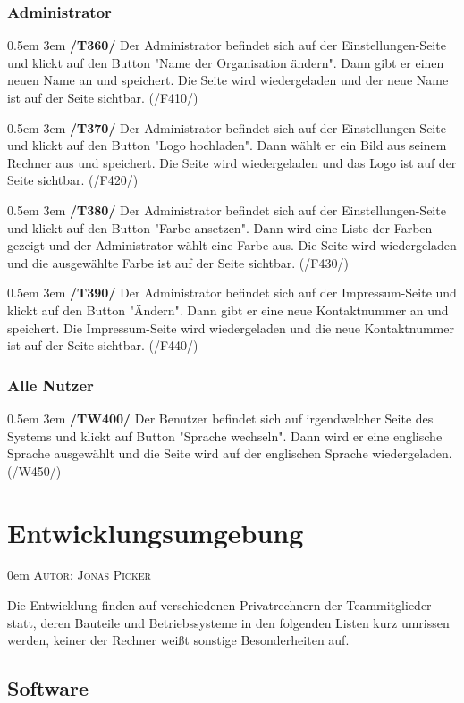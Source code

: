 \documentclass{article}
\makeatletter
\newcommand{\sectionauthor}[1]{
	{\parindent 0em \large \scshape Autor: #1 \par \nobreak \vspace*{2em}}
	\@afterheading
}
\newcommand{\specification}[3]{
	{\parindent 0.5em \hangindent 3em \hypertarget{spec:#1:#2}{\textbf{/#1#2/}} #3 \par \nobreak \vspace*{0.5em}}
}
\makeatother
\begin{document}
		\subsubsection{Administrator}
			\specification{T}{360}{Der Administrator befindet sich auf der Einstellungen-Seite und klickt auf den Button "Name der Organisation ändern". Dann gibt er einen neuen Name an und speichert. Die Seite wird wiedergeladen und der neue Name ist auf der Seite sichtbar. (/F410/) }
			\specification{T}{370}{Der Administrator befindet sich auf der Einstellungen-Seite und klickt auf den Button "Logo hochladen". Dann wählt er ein Bild aus seinem Rechner aus und speichert. Die Seite wird wiedergeladen und das Logo ist auf der Seite sichtbar. (/F420/)}
			\specification{T}{380}{Der Administrator befindet sich auf der Einstellungen-Seite und klickt auf den Button "Farbe ansetzen". Dann wird eine Liste der Farben gezeigt und der Administrator wählt eine Farbe aus. Die Seite wird wiedergeladen und die ausgewählte Farbe ist auf der Seite sichtbar. (/F430/)}
			\specification{T}{390}{Der Administrator befindet sich auf der Impressum-Seite und klickt auf den Button "Ändern". Dann gibt er eine neue Kontaktnummer an und speichert. Die Impressum-Seite wird wiedergeladen und die neue Kontaktnummer ist auf der Seite sichtbar. (/F440/)}
		\subsubsection{Alle Nutzer}
			\specification{TW}{400}{Der Benutzer befindet sich auf irgendwelcher Seite des Systems und klickt auf Button "Sprache wechseln". Dann wird er eine englische Sprache ausgewählt und die Seite wird auf der englischen Sprache wiedergeladen. (/W450/) }

\newpage

\section{Entwicklungsumgebung} %
\sectionauthor{Jonas Picker}

Die Entwicklung finden auf verschiedenen Privatrechnern der Teammitglieder statt, deren Bauteile und Betriebssysteme in den folgenden Listen kurz umrissen werden, keiner der Rechner weißt sonstige Besonderheiten auf. 

\subsection{Software}
\end{document}

